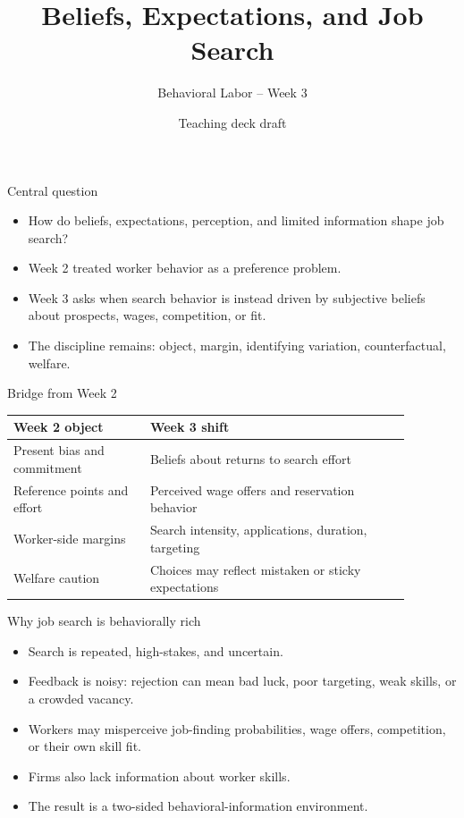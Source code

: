 \documentclass[aspectratio=169,11pt]{beamer}
\title{Beliefs, Expectations, and Job Search}
\subtitle{Behavioral Labor -- Week 3}
\author{Teaching deck draft}
\date{}
\begin{document}
\begin{frame}
  \titlepage
\end{frame}

\begin{frame}{Central question}
\begin{itemize}
    \item How do beliefs, expectations, perception, and limited information shape job search?
    \item Week 2 treated worker behavior as a preference problem.
    \item Week 3 asks when search behavior is instead driven by subjective beliefs about prospects, wages, competition, or fit.
    \item The discipline remains: object, margin, identifying variation, counterfactual, welfare.
\end{itemize}
\end{frame}

\begin{frame}{Bridge from Week 2}
\small
\begin{tabular}{p{0.30\linewidth} p{0.58\linewidth}}
\toprule
Week 2 object & Week 3 shift \\
\midrule
Present bias and commitment & Beliefs about returns to search effort \\
Reference points and effort & Perceived wage offers and reservation behavior \\
Worker-side margins & Search intensity, applications, duration, targeting \\
Welfare caution & Choices may reflect mistaken or sticky expectations \\
\bottomrule
\end{tabular}
\end{frame}

\begin{frame}{Why job search is behaviorally rich}
\begin{itemize}
    \item Search is repeated, high-stakes, and uncertain.
    \item Feedback is noisy: rejection can mean bad luck, poor targeting, weak skills, or a crowded vacancy.
    \item Workers may misperceive job-finding probabilities, wage offers, competition, or their own skill fit.
    \item Firms also lack information about worker skills.
    \item The result is a two-sided behavioral-information environment.
\end{itemize}
\end{frame}
\end{document}
